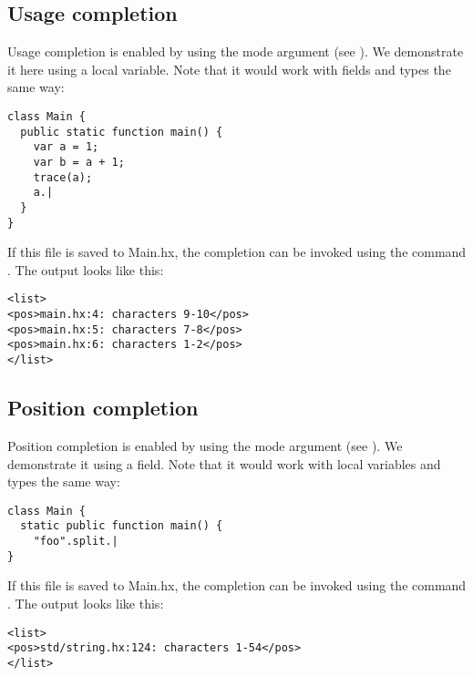 \subsection{Usage completion}
\label{cr-completion-usage}

Usage completion is enabled by using the  mode argument (see ). We demonstrate it here using a local variable. Note that it would work with fields and types the same way:

\begin{lstlisting}
class Main {
  public static function main() {
    var a = 1;
    var b = a + 1;
    trace(a);
    a.|
  }
}
\end{lstlisting}

If this file is saved to Main.hx, the completion can be invoked using the command . The output looks like this:

\begin{lstlisting}
<list>
<pos>main.hx:4: characters 9-10</pos>
<pos>main.hx:5: characters 7-8</pos>
<pos>main.hx:6: characters 1-2</pos>
</list>
\end{lstlisting}



\subsection{Position completion}
\label{cr-completion-position}

Position completion is enabled by using the  mode argument (see ). We demonstrate it using a field. Note that it would work with local variables and types the same way:

\begin{lstlisting}
class Main {
  static public function main() {
    "foo".split.|
}
\end{lstlisting}

If this file is saved to Main.hx, the completion can be invoked using the command . The output looks like this:

\begin{lstlisting}
<list>
<pos>std/string.hx:124: characters 1-54</pos>
</list>
\end{lstlisting}



